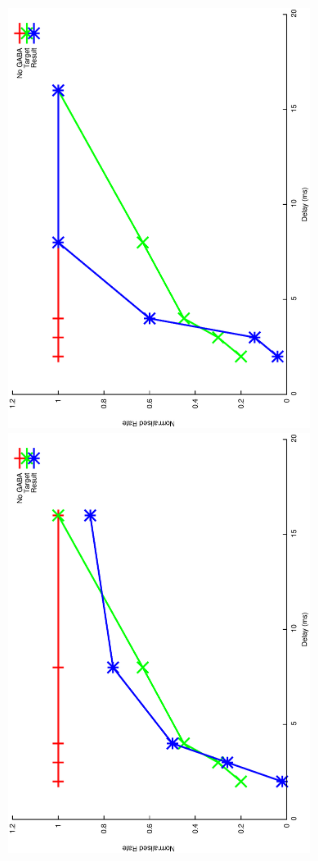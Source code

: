 \documentclass{article}
\begin{document}
\includegraphics[keepaspectratio=true,angle=-90,width=0.6\textwidth]{DS_ClickRecovery_result.31.eps}\clearpage
\includegraphics[keepaspectratio=true,angle=-90,width=0.6\textwidth]{DS_ClickRecovery_result.32.eps}\clearpage
\end{document}
